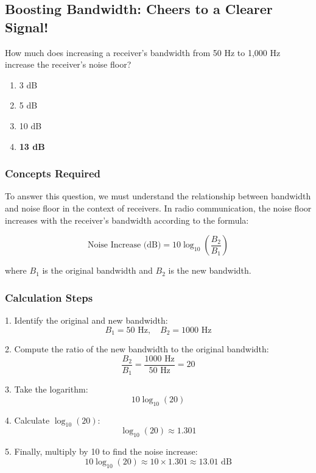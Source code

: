 \subsection{Boosting Bandwidth: Cheers to a Clearer Signal!}

\begin{tcolorbox}[colback=gray!10, colframe=black, title=E4C06`]
How much does increasing a receiver’s bandwidth from 50 Hz to 1,000 Hz increase the receiver’s noise floor? 
\begin{enumerate}[label=\Alph*.]
    \item 3 dB
    \item 5 dB
    \item 10 dB
    \item \textbf{13 dB}
\end{enumerate} \end{tcolorbox}

\subsubsection{Concepts Required}

To answer this question, we must understand the relationship between bandwidth and noise floor in the context of receivers. In radio communication, the noise floor increases with the receiver's bandwidth according to the formula:

\[
\text{Noise Increase (dB)} = 10 \log_{10}\left(\frac{B_2}{B_1}\right)
\]

where \(B_1\) is the original bandwidth and \(B_2\) is the new bandwidth. 

\subsubsection{Calculation Steps}

1. Identify the original and new bandwidth:
   \[
   B_1 = 50 \text{ Hz}, \quad B_2 = 1000 \text{ Hz}
   \]

2. Compute the ratio of the new bandwidth to the original bandwidth:
   \[
   \frac{B_2}{B_1} = \frac{1000 \text{ Hz}}{50 \text{ Hz}} = 20
   \]

3. Take the logarithm:
   \[
   10 \log_{10}(20)
   \]

4. Calculate \( \log_{10}(20) \):
   \[
   \log_{10}(20) \approx 1.301
   \]

5. Finally, multiply by 10 to find the noise increase:
   \[
   10 \log_{10}(20) \approx 10 \times 1.301 \approx 13.01 \text{ dB}
   \]

